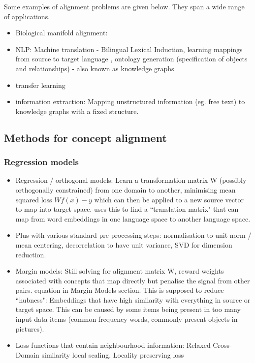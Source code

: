 Some examples of alignment problems are given below. They span a wide range of applications. 

\begin{itemize}
    \item Biological manifold alignment: \cite{magan}
    \item NLP: Machine translation - Bilingual Lexical Induction, learning mappings from source to target language \cite{kalinowski2020survey}, ontology generation (specification of objects and relationships) - also known as knowledge graphs
    \item transfer learning
    \item information extraction: Mapping unstructured information (eg. free text) to knowledge graphs with a fixed structure. 
\end{itemize}

\subsection{Methods for concept alignment}

\subsubsection{Regression models}
\begin{itemize}
        \item Regression / orthogonal models: \cite{kalinowski2020survey} Learn a transformation matrix W (possibly orthogonally constrained) from one domain to another, minimising mean squared loss $Wf(x) - y$ which can then be applied to a new source vector to map into target space. \cite{MikolovMachineTranslation} uses this to find a ``translation matrix" that can map from word embeddings in one language space to another language space. 
        \item Plus with various standard pre-processing steps: normalisation to unit norm / mean centering, decorrelation to have unit variance, SVD for dimension reduction. 
        \item Margin models: Still solving for alignment matrix W, reward weights associated with concepts that map directly but penalise the signal from other pairs. \cite{kalinowski2020survey} equation in Margin Models section. This is supposed to reduce ``hubness": Embeddings that have high similarity with everything in source or target space. This can be caused by some items being present in too many input data items (common frequency words, commonly present objects in pictures). 
        \item Loss functions that contain neighbourhood information: Relaxed Cross-Domain similarity local scaling, Locality preserving loss 
\end{itemize}

